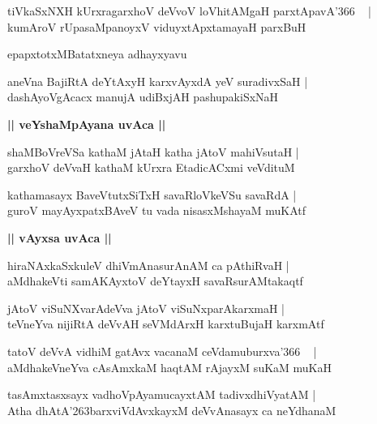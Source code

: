\documentclass[twoside,12pt,openright]{book}
\def\S{\char'263}
\newcounter{shloka}[chapter]
\def\uvaca#1{\centerline{{\large\textbf{#1}}}}
\begin{document}
\begin{shloka}%
tiVkaSxNXH kUrxragarxhoV deVvoV loVhitAMgaH parxtApavA\char'366 ~ |\\
kumAroV rUpasaMpanoyxV viduyxtApxtamayaH parxBuH 
\end{shloka}

\begin{center}
epapxtotxMBatatxneya adhayxyavu
\end{center}

\begin{shloka}%
aneVna BajiRtA deYtAxyH karxvAyxdA yeV suradivxSaH |\\
dashAyoVgAcacx manujA udiBxjAH pashupakiSxNaH 
\end{shloka}

\uvaca{|| veYshaMpAyana uvAca ||}

\begin{shloka}%
shaMBoVreVSa kathaM jAtaH katha jAtoV mahiVsutaH |\\
garxhoV deVvaH kathaM kUrxra EtadicACxmi veVdituM 
\end{shloka}

\begin{shloka}%
kathamasayx BaveVtutxSiTxH savaRloVkeVSu savaRdA |\\
guroV mayAyxpatxBAveV tu vada nisasxMshayaM muKAtf
\end{shloka}

\uvaca{|| vAyxsa uvAca ||}

\begin{shloka}%
hiraNAxkaSxkuleV dhiVmAnasurAnAM ca pAthiRvaH |\\
aMdhakeVti samAKAyxtoV deYtayxH savaRsurAMtakaqtf
\end{shloka}

\begin{shloka}%
jAtoV viSuNXvarAdeVva jAtoV viSuNxparAkarxmaH |\\
teVneYva nijiRtA deVvAH seVMdArxH karxtuBujaH karxmAtf 
\end{shloka}

\begin{shloka}%
tatoV deVvA vidhiM gatAvx vacanaM ceVdamuburxva\char'366 ~ |\\
aMdhakeVneYva cAsAmxkaM haqtAM rAjayxM suKaM muKaH 
\end{shloka}

\begin{shloka}%
tasAmxtasxsayx vadhoVpAyamucayxtAM tadivxdhiVyatAM |\\
Atha dhAtA\S barxviVdAvxkayxM deVvAnasayx ca neYdhanaM 
\end{shloka}
\end{document}
